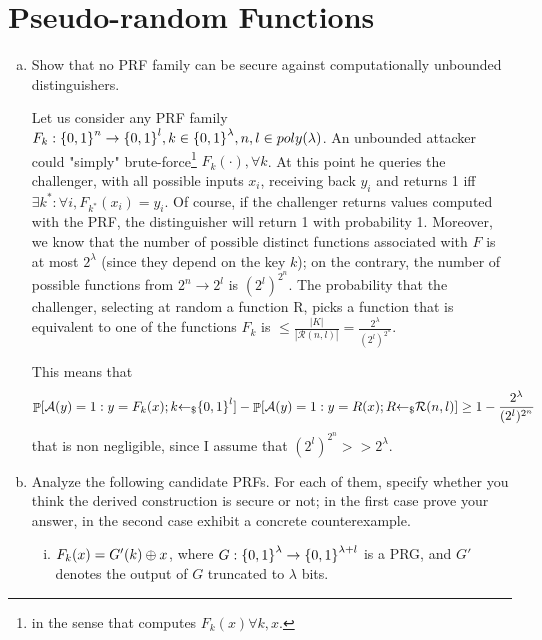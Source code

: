 \section{Pseudo-random Functions}
\begin{enumerate}[(a)]
	\item Show that no PRF family can be secure against computationally unbounded distinguishers.

	      \begin{solution}
		      Let us consider any PRF family $F_k: {\{0, 1\}}^n \to {\{0, 1\}}^l, k \in {\{0, 1\}}^\lambda, n, l \in poly(\lambda)$. An unbounded attacker could "simply" brute-force\footnote{in the sense that computes $F_k(x) \forall k,x$.} $F_k(\cdot), \forall k$. At this point he queries the challenger, with all possible inputs $x_i$, receiving back $y_i$ and returns 1 iff $\exists k^*: \forall i, F_{k^*}(x_i) = y_i$. Of course, if the challenger returns values computed with the PRF, the distinguisher will return 1 with probability 1. Moreover, we know that the number of possible distinct functions associated with $F$ is at most $2^\lambda$ (since they depend on the key $k$); on the contrary, the number of possible functions from $2^n \to 2^l$ is $(2^l)^{2^n}$. The probability that the challenger, selecting at random a function R, picks a function that is equivalent to one of the functions $F_k$ is $\le \frac{|K|}{|\mathcal{R}(n,l)|} = \frac{2^\lambda}{(2^l)^{2^n}}$.

		      This means that
		      \[\mathop{\mathbb P}[\mathcal{A}(y) = 1: y = F_k(x); k {\leftarrow_\$} {\{0, 1\}}^l] - \mathop{\mathbb P}[\mathcal{A}(y) = 1: y = R(x); R {\leftarrow_\$} \mathcal{R}(n, l)] \ge 1 - \frac{2^\lambda}{(2^l)^{2^n}}\]
		      that is non negligible, since I assume that $(2^l)^{2^n} >> 2^\lambda$.
	      \end{solution}

	\item Analyze the following candidate PRFs. For each of them, specify whether you think the derived construction is secure or not; in the first case prove your answer, in the second case exhibit a concrete counterexample.

	      \begin{enumerate}[(i)]
		      \item $F_k(x) = G'(k) \oplus x$, where $G: {\{0, 1\}}^\lambda \to {\{0, 1\}}^{\lambda + l}$ is a PRG, and $G'$ denotes the output of $G$ truncated to $\lambda$ bits.


\end{enumerate}
\end{enumerate}
